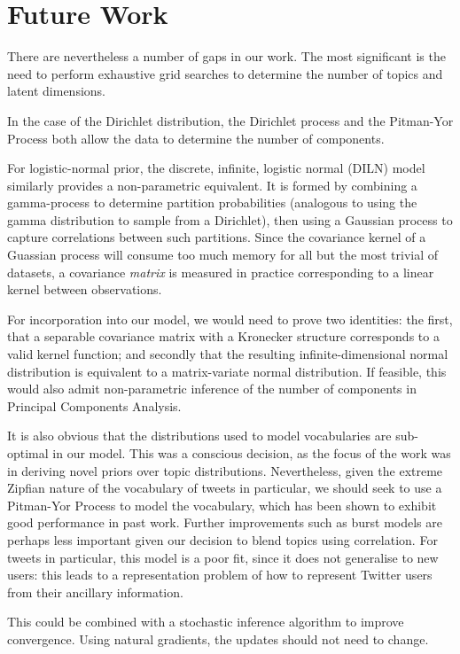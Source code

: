 \section{Future Work}
There are nevertheless a number of gaps in our work. The most significant is the need to perform exhaustive grid searches to determine the number of topics and latent dimensions.

In the case of the Dirichlet distribution, the Dirichlet process and the Pitman-Yor Process both allow the data to determine the number of components. 

For logistic-normal prior, the discrete, infinite, logistic normal (DILN) model\cite{Paisley2012b} similarly provides a non-parametric equivalent. It is formed by combining a gamma-process to determine partition probabilities (analogous to using the gamma distribution to sample from a Dirichlet), then using a Gaussian process to capture correlations between such partitions. Since the covariance kernel of a Guassian process will consume too much memory for all but the most trivial of datasets, a covariance \emph{matrix} is measured in practice corresponding to a linear kernel between observations.

For incorporation into our model, we would need to prove two identities: the first, that a separable covariance matrix with a Kronecker structure corresponds to a valid kernel function; and secondly that the resulting infinite-dimensional normal distribution is equivalent to a matrix-variate normal distribution. If feasible, this would also admit non-parametric inference of the number of components in Principal Components Analysis.

It is also obvious that the distributions used to model vocabularies are sub-optimal in our model. This was a conscious decision, as the focus of the work was in deriving novel priors over topic distributions. Nevertheless, given the extreme Zipfian nature of the vocabulary of tweets in particular, we should seek to use a Pitman-Yor Process to model the vocabulary, which has been shown to exhibit good performance in past work\cite{Buntine2014}. Further improvements such as burst models are perhaps less important given our decision to blend topics using correlation. For tweets in particular, this model is a poor fit, since it does not generalise to new users: this leads to a representation problem of how to represent Twitter users from their ancillary information.

This could be combined with a stochastic inference algorithm to improve convergence. Using natural gradients, the updates should not need to change.

